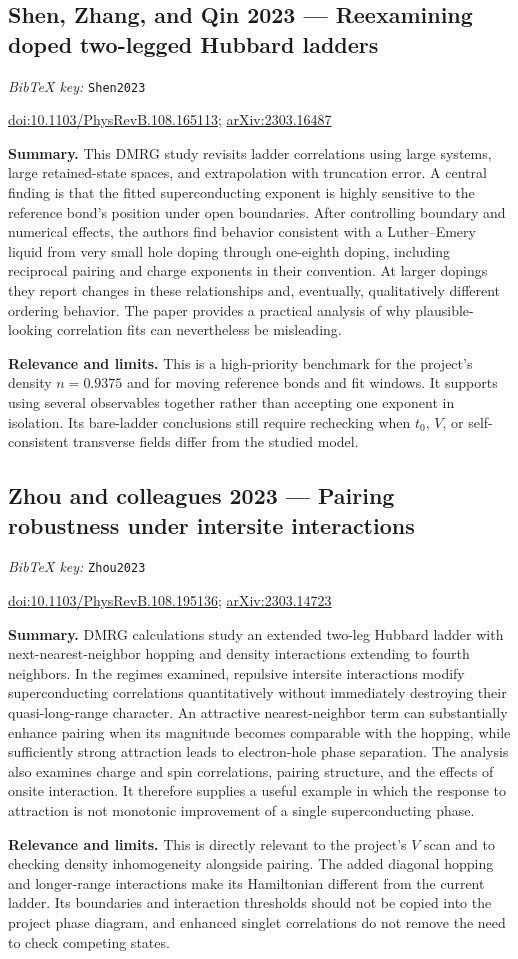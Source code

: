 \documentclass[11pt]{article}
\newcommand{\paper}[2]{\Needspace{8\baselineskip}\subsection{#2}\label{paper:#1}\textit{BibTeX key:} \texttt{#1}\quad\citep{#1}\par}
\newcommand{\doi}[1]{\href{https://doi.org/#1}{doi:#1}}
\newcommand{\arxiv}[1]{\href{https://arxiv.org/abs/#1}{arXiv:#1}}
\newcommand{\summary}{\par\textbf{Summary.} }
\newcommand{\relevance}{\par\textbf{Relevance and limits.} }
\begin{document}
\paper{Shen2023}{Shen, Zhang, and Qin 2023 --- Reexamining doped two-legged Hubbard ladders}
\doi{10.1103/PhysRevB.108.165113}; \arxiv{2303.16487}
\summary This DMRG study revisits ladder correlations using large systems, large retained-state spaces, and extrapolation with truncation error. A central finding is that the fitted superconducting exponent is highly sensitive to the reference bond's position under open boundaries. After controlling boundary and numerical effects, the authors find behavior consistent with a Luther--Emery liquid from very small hole doping through one-eighth doping, including reciprocal pairing and charge exponents in their convention. At larger dopings they report changes in these relationships and, eventually, qualitatively different ordering behavior. The paper provides a practical analysis of why plausible-looking correlation fits can nevertheless be misleading.
\relevance This is a high-priority benchmark for the project's density $n=0.9375$ and for moving reference bonds and fit windows. It supports using several observables together rather than accepting one exponent in isolation. Its bare-ladder conclusions still require rechecking when $t_0$, $V$, or self-consistent transverse fields differ from the studied model.

\paper{Zhou2023}{Zhou and colleagues 2023 --- Pairing robustness under intersite interactions}
\doi{10.1103/PhysRevB.108.195136}; \arxiv{2303.14723}
\summary DMRG calculations study an extended two-leg Hubbard ladder with next-nearest-neighbor hopping and density interactions extending to fourth neighbors. In the regimes examined, repulsive intersite interactions modify superconducting correlations quantitatively without immediately destroying their quasi-long-range character. An attractive nearest-neighbor term can substantially enhance pairing when its magnitude becomes comparable with the hopping, while sufficiently strong attraction leads to electron-hole phase separation. The analysis also examines charge and spin correlations, pairing structure, and the effects of onsite interaction. It therefore supplies a useful example in which the response to attraction is not monotonic improvement of a single superconducting phase.
\relevance This is directly relevant to the project's $V$ scan and to checking density inhomogeneity alongside pairing. The added diagonal hopping and longer-range interactions make its Hamiltonian different from the current ladder. Its boundaries and interaction thresholds should not be copied into the project phase diagram, and enhanced singlet correlations do not remove the need to check competing states.
\end{document}
